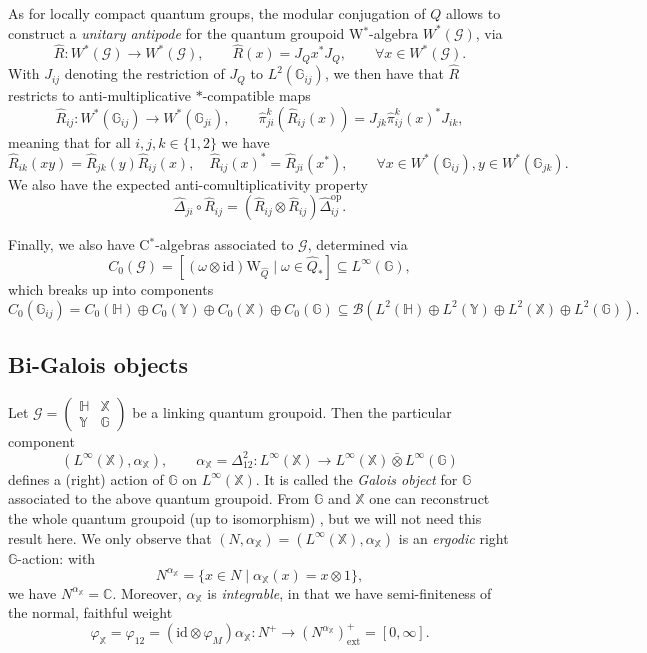 \documentclass[reqno]{amsart}
\numberwithin{equation}{section}
\newcommand{\C}{\mathbb{C}}
\newcommand{\mcB}{\mathcal{B}}
\newcommand{\id}{\mathrm{id}}
\newcommand{\G}{\mathbb{G}}
\newcommand{\Hh}{\mathbb{H}}
\newcommand{\X}{\mathbb{X}}
\newcommand{\Y}{\mathbb{Y}}
\newcommand{\opp}{\mathrm{op}}
\newcommand{\msG}{\mathscr{G}}
\newcommand{\ext}{\mathrm{ext}}
\newcommand{\vp}{\varphi}
\newcommand{\ww}{\mathrm{W}}
\begin{document}
As for locally compact quantum groups, the modular conjugation of $Q$  allows to construct a \emph{unitary antipode} for the quantum groupoid W$^*$-algebra $W^*(\msG)$, via 
\begin{equation}\label{EqUnitaryAntipodeQgr}
\hat{R}\colon W^*(\msG)\rightarrow W^*(\msG),\qquad \hat{R}(x) = J_Qx^*J_Q,\qquad \forall x\in W^*(\msG). 
\end{equation}
With $J_{ij}$ denoting the restriction of $J_Q$ to $L^2(\G_{ij})$, we then have that $\hat{R}$ restricts to anti-multiplicative $*$-compatible maps
\begin{equation}\label{EqUnitAntipodQGr}
\hat{R}_{ij}\colon W^*(\G_{ij})\rightarrow W^*(\G_{ji}),\qquad \hat{\pi}_{ji}^k(\hat{R}_{ij}(x)) = J_{jk}\hat{\pi}_{ij}^k(x)^*J_{ik},
\end{equation}
meaning that for all $i,j,k\in\{1,2\}$ we have
\begin{equation}\label{EqUnitAntipodQGrProp}
\hat{R}_{ik}(xy) = \hat{R}_{jk}(y)\hat{R}_{ij}(x),\quad \hat{R}_{ij}(x)^* = \hat{R}_{ji}(x^*),\qquad\forall x\in  W^*(\G_{ij}),y\in W^*(\G_{jk}). 
\end{equation}
We also have the expected anti-comultiplicativity property
\[
\hat{\Delta}_{ji}\circ \hat{R}_{ij}=  (\hat{R}_{ij}\otimes \hat{R}_{ij})\hat{\Delta}_{ij}^{\opp}. 
\]

Finally, we also have C$^*$-algebras associated to $\msG$, determined via 
\[
C_0(\msG) =  [(\omega\otimes \id)\ww_{\hat{Q}}\mid \omega \in \hat{Q}_*] \subseteq L^{\infty}(\G),
\]
which breaks up into components 
\[
C_0(\G_{ij}) = C_0(\Hh)\oplus C_0(\Y)\oplus C_0(\X)\oplus C_0(\G) \subseteq \mcB(L^2(\Hh)\oplus L^2(\Y) \oplus L^2(\X) \oplus L^2(\G)).
\] 



\subsection{Bi-Galois objects}\label{SecBiGal}

Let $\msG = \begin{pmatrix} \Hh & \X \\ \Y & \G\end{pmatrix}$ be a linking quantum groupoid. Then the particular component 
\begin{equation}\label{EqFormAlph}
(L^{\infty}(\X),\alpha_{\X}),\qquad \alpha_{\X}= \Delta_{12}^2\colon L^{\infty}(\X)\rightarrow L^{\infty}(\X)\bar{\otimes} L^{\infty}(\G)
\end{equation}
defines a (right) action of $\G$ on $L^{\infty}(\X)$. It is called the \emph{Galois object} for $\G$ associated to the above quantum groupoid. From $\G$ and $\X$ one can reconstruct the whole quantum groupoid (up to isomorphism) \cite{DC11b}, but we will not need this result here. We only observe that $(N,\alpha_{\X}) = (L^{\infty}(\X),\alpha_{\X})$ is an \emph{ergodic}  right $\G$-action:  with
\[
N^{\alpha_{\X}} = \{x \in N \mid \alpha_{\X}(x) = x\otimes1\},
\]
we have $N^{\alpha_{\X}} = \C$. Moreover, $\alpha_{\X}$ is \emph{integrable}, in that we have semi-finiteness of the normal, faithful weight
\[
\vp_{\X} = \vp_{12} = (\id\otimes \vp_M)\alpha_{\X}\colon N^+ \rightarrow (N^{\alpha_{\X}})_{\ext}^+ = [0,\infty].
\]
\end{document}
